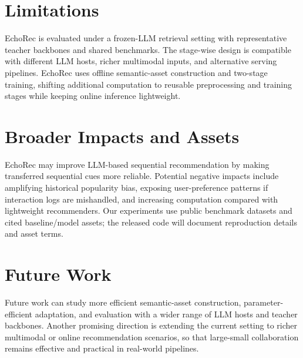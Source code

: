 ﻿\documentclass{article}
\begin{document}
\section{Limitations}
\label{app:limitations}

EchoRec is evaluated under a frozen-LLM retrieval setting with representative teacher backbones and shared benchmarks. The stage-wise design is compatible with different LLM hosts, richer multimodal inputs, and alternative serving pipelines. EchoRec uses offline semantic-asset construction and two-stage training, shifting additional computation to reusable preprocessing and training stages while keeping online inference lightweight.

\section{Broader Impacts and Assets}
\label{app:broader_assets}

EchoRec may improve LLM-based sequential recommendation by making transferred sequential cues more reliable. Potential negative impacts include amplifying historical popularity bias, exposing user-preference patterns if interaction logs are mishandled, and increasing computation compared with lightweight recommenders. Our experiments use public benchmark datasets and cited baseline/model assets; the released code will document reproduction details and asset terms.

\section{Future Work}
\label{app:future_work}

Future work can study more efficient semantic-asset construction, parameter-efficient adaptation, and evaluation with a wider range of LLM hosts and teacher backbones. Another promising direction is extending the current setting to richer multimodal or online recommendation scenarios, so that large-small collaboration remains effective and practical in real-world pipelines.

\clearpage

\end{document}
